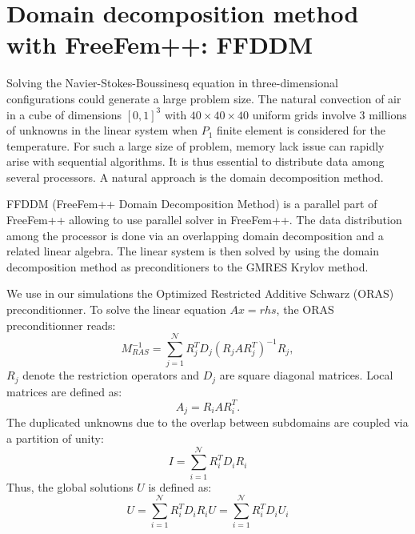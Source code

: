 
\section{Domain decomposition method with FreeFem++: FFDDM}
Solving the Navier-Stokes-Boussinesq equation in three-dimensional configurations could generate a large problem size.
The natural convection of air in a cube of dimensions $[0,1]^3$ with $40 \times 40 \times 40$ uniform grids involve $3$ millions of unknowns in the linear system when $P_1$ finite element is considered for the temperature.
For such a large size of problem, memory lack issue can rapidly arise with sequential algorithms.
It is thus essential to distribute data among several processors.
A natural approach is the domain decomposition method.

FFDDM (FreeFem++ Domain Decomposition Method) is a parallel part of FreeFem++ allowing to use parallel solver in FreeFem++.
The data distribution among the processor is done via an overlapping domain decomposition and a related linear algebra.
The linear system is then solved by using the domain decomposition method as preconditioners to the GMRES Krylov method.

We use in our simulations the Optimized Restricted Additive Schwarz (ORAS) preconditionner.
To solve the linear equation $A x = rhs$, the ORAS preconditionner reads:
\begin{equation}
   M_{RAS}^{-1} = \sum_{j=1}^{\mathcal{N}} R^T_j D_j (R_j A R^T_j)^{-1} R_j,
\end{equation}
$R_j$ denote the restriction operators and $D_j$ are square diagonal matrices.
Local matrices are defined as:
\begin{equation}
   A_j = R_i A R_i^T.
\end{equation}
The duplicated unknowns due to the overlap between subdomains are coupled via a partition of unity:
\begin{equation}
   I = \sum_{i=1}^{\mathcal{N}} R_i^T D_i R_i
\end{equation}
Thus, the global solutions $U$ is defined as:
\begin{equation}
  U = \sum_{i=1}^{\mathcal{N}} R_i^T D_i R_i U =  \sum_{i=1}^{\mathcal{N}} R_i^T D_i U_i
\end{equation}

